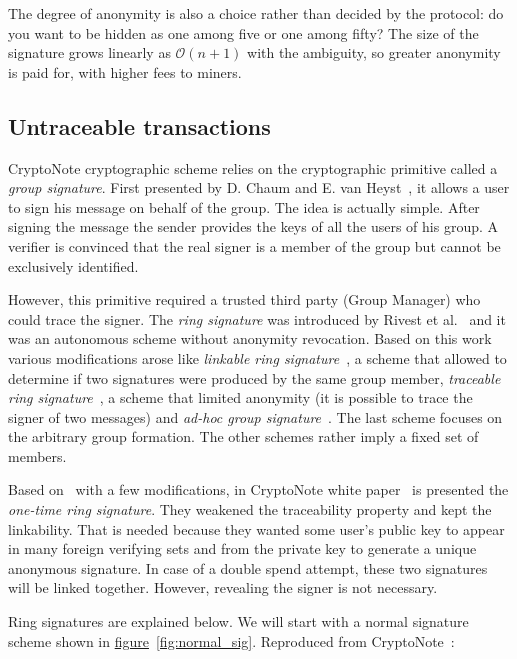 The degree of anonymity is also a choice rather than decided by the protocol: do you want to be hidden as one among five or one among fifty? The size of the signature grows linearly as $\mathcal{O}(n+1)$ with the ambiguity, so greater anonymity is paid for, with higher fees to miners.

\subsection{Untraceable transactions} \label{sec:untraceable}
CryptoNote cryptographic scheme relies on the cryptographic primitive called a \emph{group signature}. First presented by D. Chaum and E. van Heyst~\cite{group}, it allows a user to sign his message on behalf of the group. The idea is actually simple. After signing the message the sender provides the keys of all the users of his group. A verifier is convinced that the real signer is a member of the group but cannot be exclusively identified.

However, this primitive required a trusted third party (Group Manager) who could trace the signer. The \emph{ring signature} was introduced by Rivest et al.~\cite{ring} and it was an autonomous scheme without anonymity revocation. Based on this work various modifications arose like \emph{linkable ring signature}~\cite{link1,link2,short}, a scheme that allowed to determine if two signatures were produced by the same group member, \emph{traceable ring signature}~\cite{traceable1,traceable2}, a scheme that limited anonymity (it is possible to trace the signer of two messages) and \emph{ad-hoc group signature}~\cite{ad-hoc1,ad-hoc2}. The last scheme focuses on the arbitrary group formation. The other schemes rather imply a fixed set of members.
\pagebreak

Based on~\cite{traceable2} with a few modifications, in CryptoNote white paper~\cite{citeulike:14139412} is presented the \emph{one-time ring signature}. They weakened the traceability property and kept the linkability. That is needed because they wanted some user's public key to appear in many foreign verifying sets and from the private key to generate a unique anonymous signature. In case of a double spend attempt, these two signatures will be linked together. However, revealing the signer is not necessary.

Ring signatures are explained below. We will start with a normal signature scheme shown in \hyperref[fig:normal_sig]{figure}~\ref{fig:normal_sig}. Reproduced from CryptoNote~\cite{cryptonote}:


